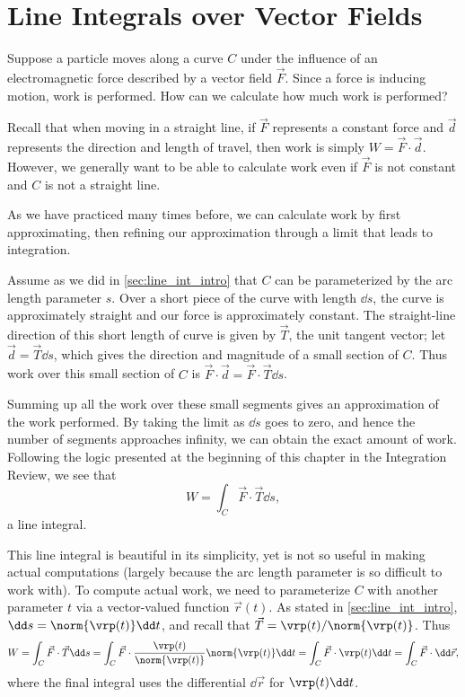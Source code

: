 \section{Line Integrals over Vector Fields}\label{sec:line_int_vf}

Suppose a particle moves along a curve $C$ under the influence of an electromagnetic force described by a vector field $\vec F$. Since a force is inducing motion, work is performed. How can we calculate how much work is performed?

Recall that when moving in a straight line, if $\vec F$ represents a constant force and $\vec d$ represents the direction and length of travel, then work is simply $W = \vec F\cdot \vec d$. However, we generally want to be able to calculate work even if $\vec F$ is not constant and $C$ is not a straight line.

As we have practiced many times before, we can calculate work by first approximating, then refining our approximation through a limit that leads to integration. 

Assume as we did in \autoref{sec:line_int_intro} that $C$ can be parameterized by the arc length parameter $s$. Over a short piece of the curve with length $\dd s$, the curve is approximately straight and our force is approximately constant. The straight-line direction of this short length of curve is given by $\vec T$, the unit tangent vector;   let $\vec d = \vec T\dd s$, which gives  the direction and magnitude of a small section of $C$. Thus work over this small section of $C$ is $\vec F \cdot \vec d = \vec F\cdot \vec T\dd s$. 

Summing up all the work over these small segments gives an approximation of the work performed. By taking the limit as $\dd s$ goes to zero, and hence the number of segments approaches infinity, we can obtain the exact amount of work. Following the logic presented at the beginning of this chapter in the Integration Review, we see that 
\[W = \int_C \vec F\cdot \vec T\dd s,\]
a line integral.

This line integral is beautiful in its simplicity, yet is not so useful in making actual computations (largely because the arc length parameter is so difficult to work with). To compute actual work, we need to parameterize $C$ with another parameter  $t$ via a vector-valued function $\vec r(t)$. As stated in \autoref{sec:line_int_intro}, $\dd s = \norm{\vrp(t)}\dd t$, and recall that $\vec T = \vrp(t)/\norm{\vrp(t)}$. Thus
\begin{equation}
W = \int_C \vec F\cdot\vec T\dd s
= \int_C \vec F\cdot \frac{\vrp(t)}{\norm{\vrp(t)}}\norm{\vrp(t)}\dd t
= \int_C\vec F\cdot \vrp(t)\dd t = \int_C \vec F\cdot\dd\vec r,
\label{eq:line_integral}
\end{equation}
where the final integral uses the differential $\dd\vec r$ for $\vrp(t)\dd t$.

